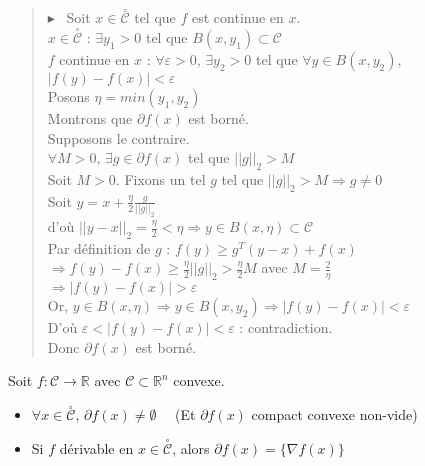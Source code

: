 \documentclass[12pt,a4paper]{article}
\newcommand{\propriete}[2]{%
    \begin{tcolorbox}[colback=white,colframe=green!25!white,title=\textbf{Propriété #1}, coltitle=black]
        #2
    \end{tcolorbox}
}
\newcommand{\preuve}[1]{%
    \begin{quote}
        $\blacktriangleright$~#1
    \end{quote}
}
\begin{document}
\preuve{
    Soit $x \in \overset{\circ}{\mathcal{C}}$ tel que $f$ est continue en $x$.\\
$x \in \overset{\circ}{\mathcal{C}}$ : $\exists y_1 > 0$ tel que $B(x, y_1) \subset \mathcal{C}$\\
$f$ continue en $x$ : $\forall \varepsilon > 0$, $\exists y_2 > 0$ tel que $\forall y \in B(x, y_2)$, $|f(y) - f(x)| < \varepsilon$\\

Posons $\eta = min(y_1, y_2)$\\

Montrons que $\partial f(x)$ est borné.\\
Supposons le contraire.\\
$\forall M > 0$, $\exists g \in \partial f(x)$ tel que $||g||_2 > M$\\
Soit $M > 0$. Fixons un tel $g$ tel que $||g||_2 > M \Rightarrow g \neq 0$\\

Soit $y = x + \frac{\eta}{2} \frac{g}{||g||_2}$\\
d'où $||y - x||_2 = \frac{\eta}{2} < \eta \Rightarrow y \in B(x, \eta) \subset \mathcal{C}$\\

Par définition de $g$ : $f(y) \geq g^T(y - x) + f(x)$\\
$\Rightarrow f(y) - f(x) \geq \frac{\eta}{2} ||g||_2 > \frac{\eta}{2} M$ avec $M = \frac{2}{\eta}$\\
$\Rightarrow |f(y) - f(x)| > \varepsilon$\\

Or, $y \in B(x, \eta) \Rightarrow y \in B(x, y_2) \Rightarrow |f(y) - f(x)| < \varepsilon$\\

D'où $\varepsilon < |f(y) - f(x)| < \varepsilon$ : contradiction.\\

Donc $\partial f(x)$ est borné.
}


\propriete{}{
    Soit $f : \mathcal{C} \rightarrow \mathbb{R}$ avec $\mathcal{C} \subset \mathbb{R}^n$ convexe.
    \begin{itemize}
        \item $\forall x \in \overset{\circ}{\mathcal{C}}$, $\partial f(x) \neq \emptyset \quad$ (Et $\partial f(x)$ compact convexe non-vide)
        \item Si $f$ dérivable en $x \in \overset{\circ}{\mathcal{C}}$, alors $\partial f(x) = \{\nabla f(x)\}$
    \end{itemize}
}
\end{document}
